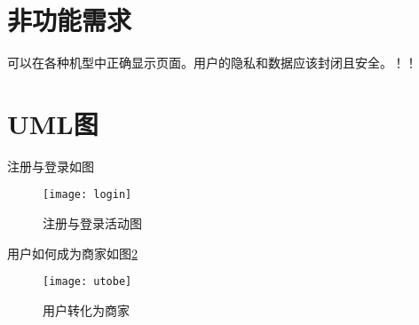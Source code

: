 \section{非功能需求}
可以在各种机型中正确显示页面。用户的隐私和数据应该封闭且安全。！！

\section{UML图}
注册与登录如图
\begin{figure}[htbp]
    \centering
    \texttt{[image: login]}
    \caption{注册与登录活动图}\label{fig:ds}
\end{figure}

用户如何成为商家如图\ref{fig:dd}
\begin{figure}[htbp]
    \centering
    \texttt{[image: utobe]}
    \caption{用户转化为商家}\label{fig:dd}
\end{figure}
